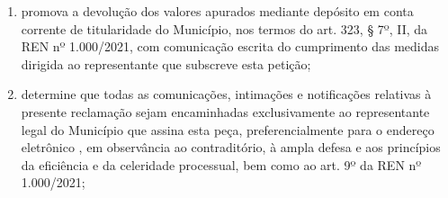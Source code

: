 \begin{enumerate}[resume]
\begin{enumerate}
        \item promova a devolução dos valores apurados mediante depósito em conta corrente de titularidade do Município, nos termos do art. 323, § 7º, II, da REN nº 1.000/2021, com comunicação escrita do cumprimento das medidas dirigida ao representante que subscreve esta petição;
        \item determine que todas as comunicações, intimações e notificações relativas à presente reclamação sejam encaminhadas exclusivamente ao representante legal do Município que assina esta peça, preferencialmente para o endereço eletrônico \EmailEmpresa{}, em observância ao contraditório, à ampla defesa e aos princípios da eficiência e da celeridade processual, bem como ao art. 9º da REN nº 1.000/2021;

    \end{enumerate}

\end{enumerate}